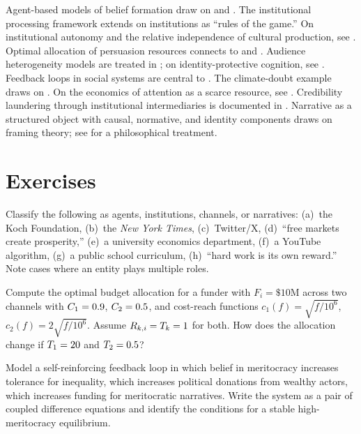 Agent-based models of belief formation draw on \textcite{jackson2008} and \textcite{granovetter1978}.
The institutional processing framework extends \textcite{north1990} on institutions as ``rules of the game.''
On institutional autonomy and the relative independence of cultural production, see \textcite{bourdieu1984}.
Optimal allocation of persuasion resources connects to \textcite{downs1957} and \textcite{tullock1967}.
Audience heterogeneity models are treated in \textcite{manski1993}; on identity-protective cognition, see \textcite{kahan2012}.
Feedback loops in social systems are central to \textcite{schelling1978}.
The climate-doubt example draws on \textcite{oreskes2010}.
On the economics of attention as a scarce resource, see \textcite{kahneman2011}.
Credibility laundering through institutional intermediaries is documented in \textcite{mayer2016}.
Narrative as a structured object with causal, normative, and identity components draws on framing theory; see \textcite{stanley2015} for a philosophical treatment.


\section{Exercises}

\begin{exercise}
Classify the following as agents, institutions, channels, or narratives: (a)~the Koch Foundation, (b)~the \textit{New York Times}, (c)~Twitter/X, (d)~``free markets create prosperity,'' (e)~a university economics department, (f)~a YouTube algorithm, (g)~a public school curriculum, (h)~``hard work is its own reward.''
Note cases where an entity plays multiple roles.
\end{exercise}

\begin{exercise}
\label{ex:ch4-allocation}
Compute the optimal budget allocation for a funder with $F_i = \$10\text{M}$ across two channels with $C_{1} = 0.9$, $C_{2} = 0.5$, and cost-reach functions $c_1(f) = \sqrt{f/10^6}$, $c_2(f) = 2\sqrt{f/10^6}$.
Assume $R_{k,i} = T_{k} = 1$ for both.
How does the allocation change if $T_{1} = 20$ and $T_{2} = 0.5$?
\end{exercise}

\begin{exercise}
Model a self-reinforcing feedback loop in which belief in meritocracy increases tolerance for inequality, which increases political donations from wealthy actors, which increases funding for meritocratic narratives.
Write the system as a pair of coupled difference equations and identify the conditions for a stable high-meritocracy equilibrium.
\end{exercise}

